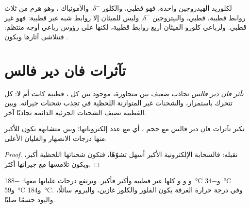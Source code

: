 \begin{example}\label{ex:g11:polarity-and-cohesion:four}
لكلوريد الهيدروجين   واحدة، فهو قطبي، والكلور
$\delta^-$. والأمونياك ، وهو هرم من ثلاث روابط  قطبية،
قطبي، والنيتروجين $\delta^-$. وليس للميثان  إلا روابط  شبه
غير قطبية: فهو غير قطبي. ولرباعي كلورو الميثان  أربع روابط
 قطبية، لكنها على رؤوس رباعي أوجه منتظم: فتتلاشى آثارها ويكون .
\end{example}

\section{تآثرات فان دير فالس}

\begin{definition}\label{def:g11:polarity-and-cohesion:van-der-waals}
\emph{تآثر فان دير فالس} تجاذب ضعيف بين 
متجاورة، موجود بين كل ، قطبية كانت أم لا:  كل  تتحرك
باستمرار، والشحنات غير المتوازنة اللحظية في  تجذب شحنات جيرانه. وبين
 القطبية تضيف الشحنات الجزئية الدائمة تجاذبًا
آخر.
\end{definition}


\begin{proposition}\label{prop:g11:polarity-and-cohesion:size}
تكبر تآثرات فان دير فالس مع حجم ، أي مع عدد إلكتروناتها؛ وبين 
متشابهة تكون للأكبر منها درجات الانصهار والغليان
الأعلى.
\end{proposition}

\begin{proof}
نقبله: فالسحابة الإلكترونية الأكبر أسهل تشوّهًا، فتكون شحناتها اللحظية أكبر،
ويكون تلامسها مع جيرانها أكثر.
\end{proof}

\begin{example}[الهالوجينات]\label{ex:g11:polarity-and-cohesion:halogens}
  و و و كلها غير قطبية وأكبر
فأكبر. وترتفع درجات غليانها معها:
\qty{-188}{\celsius} و\qty{-34}{\celsius} و\qty{59}{\celsius}
و\qty{184}{\celsius}. وفي درجة حرارة الغرفة يكون الفلور والكلور غازين، والبروم
سائلًا، واليود جسمًا صلبًا.
\end{example}

